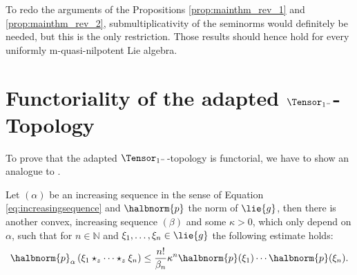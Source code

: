 \documentclass[
11pt,                          %
english                        %
]{article}
\begin{document}
To redo the arguments of the Propositions \ref{prop:mainthm_rev_1} and 
\ref{prop:mainthm_rev_2}, submultiplicativity of the seminorms would definitely be 
needed, but this is the only restriction. Those results should hence hold for every 
uniformly m-quasi-nilpotent Lie algebra.



\appendix
\section{Functoriality of the adapted $\Tensor_{1^-}$-Topology}
\label{sec:app}

To prove that the adapted $\Tensor_{1^-}$-topology is functorial, we have to show an 
analogue to \cite[Lemma 3.11]{esposito.stapor.waldmann:2015a:pre}. 
\begin{proposition}
	Let $(\alpha)$ be an increasing sequence in the sense of Equation 
	\eqref{eq:increasingsequence} and $\halbnorm{p}$ the norm of 
	$\lie{g}$, then there is another convex, increasing sequence $(\beta)$ 
	and some $\kappa > 0$, which only depend on $\alpha$, such that for $n \in 
	\mathbb{N}$ and $\xi_1, \ldots, \xi_n \in \lie{g}$ the following estimate holds:
	\begin{equation}
		\halbnorm{p}_\alpha
		\left(
			\xi_1 \star_z \cdots \star_z \xi_n
		\right)
		\leq
		\frac{n!}{\beta_n} \kappa^n
		\halbnorm{p}(\xi_1) \cdots \halbnorm{p}(\xi_n).
	\end{equation}
\end{proposition}
\end{document}
